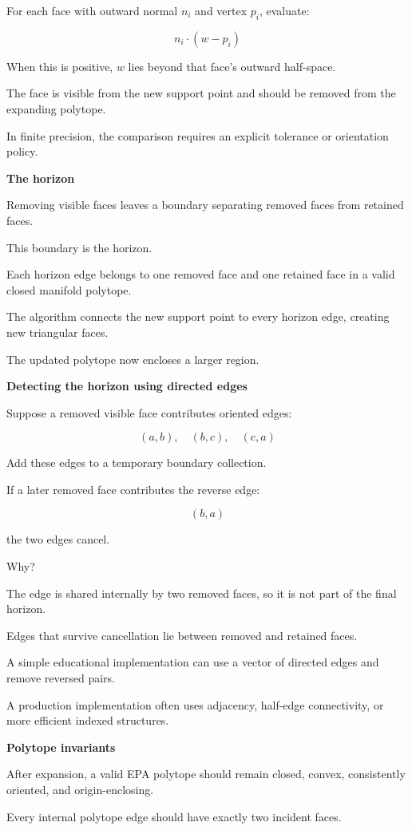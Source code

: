 For each face with outward normal \(n_i\) and vertex \(p_i\), evaluate:

\[
\boxed{ n_i\cdot(w-p_i) }
\]

When this is positive, \(w\) lies beyond that face's outward half-space.

The face is visible from the new support point and should be removed from the expanding polytope.

In finite precision, the comparison requires an explicit tolerance or orientation policy.

\textbf{The horizon}

Removing visible faces leaves a boundary separating removed faces from retained faces.

This boundary is the horizon.

Each horizon edge belongs to one removed face and one retained face in a valid closed manifold polytope.

The algorithm connects the new support point to every horizon edge, creating new triangular faces.

The updated polytope now encloses a larger region.

\textbf{Detecting the horizon using directed edges}

Suppose a removed visible face contributes oriented edges:

\[
(a,b),\quad(b,c),\quad(c,a)
\]

Add these edges to a temporary boundary collection.

If a later removed face contributes the reverse edge:

\[
(b,a)
\]

the two edges cancel.

Why?

The edge is shared internally by two removed faces, so it is not part of the final horizon.

Edges that survive cancellation lie between removed and retained faces.

A simple educational implementation can use a vector of directed edges and remove reversed pairs.

A production implementation often uses adjacency, half-edge connectivity, or more efficient indexed structures.

\textbf{Polytope invariants}

After expansion, a valid EPA polytope should remain closed, convex, consistently oriented, and origin-enclosing.

Every internal polytope edge should have exactly two incident faces.

